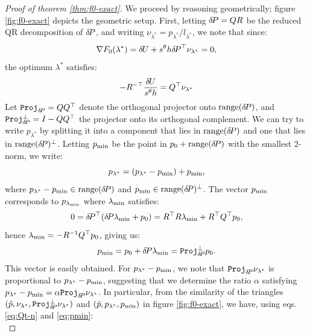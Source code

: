 \documentclass[smallcondensed]{svjour3}
\begin{document}
\begin{proof}[Proof of theorem \ref{thm:f0-exact}]
  We proceed by reasoning geometrically; figure \ref{fig:f0-exact}
  depicts the geometric setup. First, letting ${\delta \hspace{-0.14em} P} = QR$ be the
  reduced QR decomposition of ${\delta \hspace{-0.14em} P}$, and writing
  $\nu_{\lambda^*} = p_{\lambda^*}/l_{\lambda^*}$, we note that since:
  \begin{equation}
    \nabla F_0(\lambda^*) = {\delta \hspace{-0.09em} U} + s^\theta h {\delta \hspace{-0.14em} P}^\top \nu_{\lambda^*} = 0,
  \end{equation}
  the optimum $\lambda^*$ satisfies:
  \begin{equation}\label{eq:Qt-n}
    - R^{-\top} \frac{{\delta \hspace{-0.09em} U}}{s^\theta h} = Q^\top \nu_{\lambda^*}
  \end{equation}
  Let $\mathtt{Proj}_{{\delta \hspace{-0.14em} P}} = QQ^\top$ denote the orthogonal
  projector onto $\operatorname{range}({\delta \hspace{-0.14em} P})$, and
  $\mathtt{Proj}^\perp_{{\delta \hspace{-0.14em} P}} = I - QQ^\top$ the projector onto its
  orthogonal complement. We can try to write $p_{\lambda^*}$ by
  splitting it into a component that lies in $\operatorname{range}({\delta \hspace{-0.14em} P})$ and
  one that lies in $\operatorname{range}({\delta \hspace{-0.14em} P})^\perp$. Letting $p_{\operatorname{min}}$ be the
  point in $p_0 + \operatorname{range}({\delta \hspace{-0.14em} P})$ with the smallest 2-norm, we
  write:
  \begin{equation}\label{eq:plam-decomp}
    p_{\lambda^*} = (p_{\lambda^*} - p_{\operatorname{min}}) + p_{\operatorname{min}},
  \end{equation}
  where $p_{\lambda^*} - p_{\operatorname{min}} \in \operatorname{range}({\delta \hspace{-0.14em} P})$ and
  $p_{\operatorname{min}} \in \operatorname{range}({\delta \hspace{-0.14em} P})^\perp$. The vector $p_{\operatorname{min}}$ corresponds to
  $p_{\lambda_{\operatorname{min}}}$ where $\lambda_{\operatorname{min}}$ satisfies:
  \begin{equation}
    0 = {\delta \hspace{-0.14em} P}^\top ({\delta \hspace{-0.14em} P} \lambda_{\operatorname{min}} + p_0) = R^\top R \lambda_{\operatorname{min}} + R^\top Q^\top p_0,
  \end{equation}
  hence $\lambda_{\operatorname{min}} = -R^{-1} Q^\top p_0$, giving us:
  \begin{equation}\label{eq:pmin}
    p_{\operatorname{min}} = p_0 + {\delta \hspace{-0.14em} P} \lambda_{\operatorname{min}} = \mathtt{Proj}^\perp_{{\delta \hspace{-0.14em} P}} p_0.
  \end{equation}
  This vector is easily obtained. For $p_{\lambda^*} - p_{\operatorname{min}}$, we note
  that $\mathtt{Proj}_{{\delta \hspace{-0.14em} P}} \nu_{\lambda^*}$ is proportional to
  $p_{\lambda^*} - p_{\operatorname{min}}$, suggesting that we determine the ratio
  $\alpha$ satisfying
  $p_{\lambda^*} - p_{\operatorname{min}} = \alpha \mathtt{Proj}_{{\delta \hspace{-0.14em} P}}
  \nu_{\lambda^*}$. In particular, from the similarity of the
  triangles
  $(\hat{p}, \nu_{\lambda^*}, \mathtt{Proj}^\perp_{{\delta \hspace{-0.14em} P}}
  \nu_{\lambda^*})$ and $(\hat{p}, p_{\lambda^*}, p_{\operatorname{min}})$ in figure
  \ref{fig:f0-exact}, we have, using eqs.\@ \ref{eq:Qt-n} and
  \ref{eq:pmin}:
  \begin{equation}\label{eq:alpha-solve}

\end{equation}
\end{proof}
\end{document}
